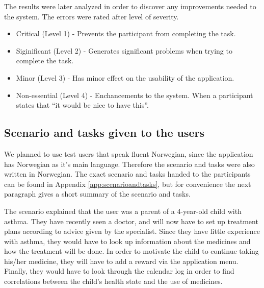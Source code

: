 The results were later analyzed in order to discover any improvements needed to the system. The errors were rated after level of severity\cite{dumas1995practical}. 

\begin{itemize}
\item{Critical (Level 1) - Prevents the participant from completing the task.}
\item{Siginificant (Level 2) - Generates significant problems when trying to complete the task.}
\item{Minor (Level 3) - Has minor effect on the usability of the application.}
\item{Non-essential (Level 4) - Enchancements to the system. When a participant states that ``it would be nice to have this''.}
\end{itemize}



\subsection{Scenario and tasks given to the users}
We planned to use test users that speak fluent Norwegian, since the application has Norwegian as it's main language. Therefore the scenario and tasks were also written in Norwegian. The exact scenario and tasks handed to the participants can be found in Appendix \ref{app:scenarioandtasks}, but for convenience the next paragraph gives a short summary of the scenario and tasks.

The scenario explained that the user was a parent of a 4-year-old child with asthma. They have recently seen a doctor, and will now have to set up treatment plans according to advice given by the specialist. Since they have little experience with asthma, they would have to look up information about the medicines and how the treatment will be done. In order to motivate the child to continue taking his/her medicine, they will have to add a reward via the application menu. Finally, they would have to look through the calendar log in order to find correlations between the child's health state and the use of medicines. 

